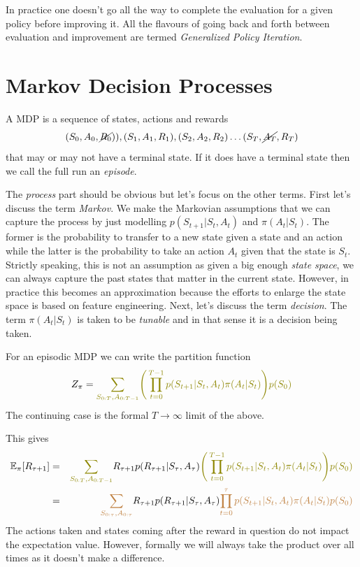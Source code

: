 \documentclass[11pt,a4paper]{article}
\newcommand\be{\begin{equation}}
\newcommand\bea{\begin{eqnarray}}
\newcommand\ee{\end{equation}}
\newcommand\eea{\end{eqnarray}}
\newcommand{\nn}{\nonumber \\}
\newcommand{\partitionfunctionintegrand}{{\color{olive} \Bigg(  \prod_{t=0}^{T-1} p(S_{t+1}|S_t,A_t) \pi(A_t|S_t) \Bigg) p(S_0) }}
\newcommand{\partitionfunctionintegral}{{\color{olive} \sum_{S_{0:T}, A_{0:T-1}}}}
\begin{document}
In practice one doesn't go all the way to complete the evaluation for a given policy before improving it. All the flavours of going back and forth between evaluation and improvement are termed {\em Generalized Policy Iteration}.



\section{Markov Decision Processes}

A MDP is a sequence of states, actions and rewards 
\be
(S_0,A_0,\cancel{R_0})),(S_1,A_1,R_1),(S_2,A_2,R_2) \dots (S_T,\cancel{A_T},R_T) \label{MDP}
\ee
that may or may not have a terminal state. If it does have a terminal state then we call the full run an {\em episode}.

The {\em process} part should be obvious but let's focus on the other terms. First let's discuss the term {\em Markov}. We make the  Markovian assumptions that we can capture the process by just modelling $p(S_{t+1}|S_t,A_t)$ and $\pi(A_t|S_t)$. The former is the probability to transfer to a new state given a state and an action while  the latter is the probability to take an action $A_t$ given that the state is $S_t$. Strictly speaking, this is not an assumption as given a big enough {\em state space}, we can always capture the past states that matter in the current state. However, in practice this becomes an approximation because the efforts to enlarge the state space is based on feature engineering. Next, let's discuss the term {\em decision}. The term $\pi(A_t|S_t)$ is taken to be {\em tunable} and in that sense it is a decision being taken.

 
For an episodic MDP we can write the partition function
\bea
Z_\pi = \partitionfunctionintegral \partitionfunctionintegrand
\eea
The continuing case is the formal $T \to \infty$ limit of the above.
 
This gives
\bea
\mathbb E_\pi[R_{\tau+1}] &=&  \partitionfunctionintegral R_{\tau+1} p(R_{\tau+1}|S_\tau,A_\tau) \partitionfunctionintegrand\nn
&=& {\color{brown} \sum_{S_{0:\tau}, A_{0:\tau}}}  R_{\tau+1} p(R_{\tau+1}|S_\tau,A_\tau) {\color{brown} \prod_{t=0}^{\tau} p(S_{t+1}|S_t,A_t) \pi(A_t|S_t)  p(S_0)}
\eea
The actions taken and states coming  after the reward in question do not impact the expectation value.  However, formally we will always take the product over all times as it doesn't make a difference.  
\end{document}
